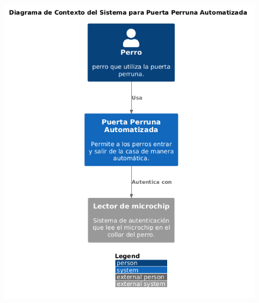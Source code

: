 \begin{figure}[!h] 
\centering
\includegraphics[scale=0.5]{Pictures/capt-asw/contextoPP.png}\caption{}
\end{figure}




